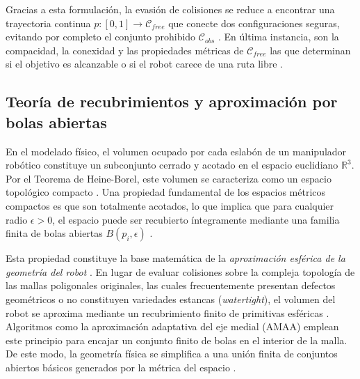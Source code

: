 Gracias a esta formulación, la evasión de colisiones se reduce a encontrar una 
trayectoria continua $p: [0, 1] \to \mathcal{C}_{free}$ \parencite{Mosquera2017} 
que conecte dos configuraciones seguras, evitando por completo el conjunto 
prohibido $\mathcal{C}_{obs}$ \parencite{lynch2017modern}. En última instancia, 
son la compacidad, la conexidad y las propiedades métricas de $\mathcal{C}_{free}$ 
las que determinan si el objetivo es alcanzable o si el robot carece de una ruta 
libre \parencite{oniani2019topology}.


\subsection{Teoría de recubrimientos y aproximación por bolas abiertas}

En el modelado físico, el volumen ocupado por cada eslabón de un 
manipulador robótico constituye un subconjunto cerrado y acotado en 
el espacio euclidiano $\mathbb{R}^3$. Por el Teorema de Heine-Borel, 
este volumen se caracteriza como un espacio topológico compacto \parencite{antonyan2016topologia}. Una propiedad 
fundamental de los espacios métricos compactos es que son 
totalmente acotados, lo que implica que para cualquier radio 
$\epsilon > 0$, el espacio puede ser recubierto íntegramente 
mediante una familia finita de bolas abiertas 
$B(p_i, \epsilon)$ \parencite{antonyan2016topologia}.

Esta propiedad constituye la base matemática de la 
\textit{aproximación esférica de la geometría del robot} 
\parencite{coumar2025foam}. En lugar de evaluar colisiones sobre 
la compleja topología de las mallas poligonales 
originales, las cuales frecuentemente presentan defectos geométricos 
o no constituyen variedades estancas (\textit{watertight}), 
el volumen del robot se aproxima mediante un recubrimiento finito de 
primitivas esféricas \parencite{coumar2025foam}. Algoritmos como la 
aproximación adaptativa del eje medial (AMAA) emplean este principio 
para encajar un conjunto finito de bolas en el interior de la malla. De 
este modo, la geometría física se simplifica a una unión finita de 
conjuntos abiertos básicos generados por la métrica del espacio 
\parencite{coumar2025foam}.

